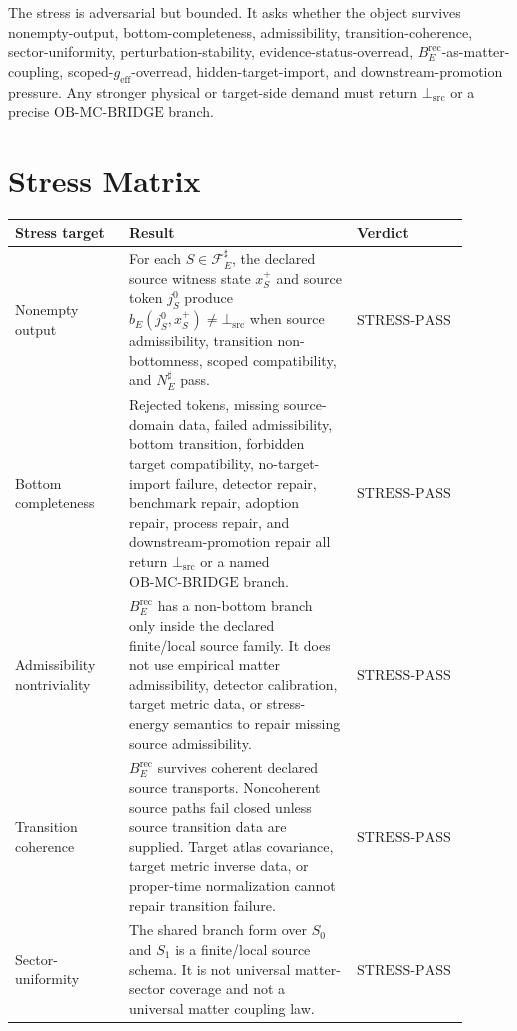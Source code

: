 \documentclass[11pt]{article}
\newcommand{\geff}{g_{\mathrm{eff}}}
\newcommand{\BottomSrc}{\bot_{\mathrm{src}}}
\newcommand{\OBMCB}{\mathrm{OB}\mbox{-}\mathrm{MC}\mbox{-}\mathrm{BRIDGE}}
\newcommand{\BErec}{B_E^{\mathrm{rec}}}
\newcommand{\StressPass}{\mathrm{STRESS}\mbox{-}\mathrm{PASS}}
\begin{document}
The stress is adversarial but bounded. It asks whether the object survives
nonempty-output, bottom-completeness, admissibility, transition-coherence,
sector-uniformity, perturbation-stability, evidence-status-overread,
\(\BErec\)-as-matter-coupling, scoped-\(\geff\)-overread, hidden-target-import,
and downstream-promotion pressure. Any stronger physical or target-side demand
must return \(\BottomSrc\) or a precise \(\OBMCB\) branch.

\section{Stress Matrix}

\begin{longtable}{p{0.24\linewidth}p{0.48\linewidth}p{0.18\linewidth}}
\toprule
Stress target & Result & Verdict \\
\midrule
Nonempty output &
For each \(S\in\mathcal{F}_E^\sharp\), the declared source witness state
\(x_S^+\) and source token \(j_S^0\) produce \(b_E(j_S^0,x_S^+)\neq
\BottomSrc\) when source admissibility, transition non-bottomness, scoped
compatibility, and \(N_E^\sharp\) pass. & \(\StressPass\) \\
\addlinespace
Bottom completeness &
Rejected tokens, missing source-domain data, failed admissibility, bottom
transition, forbidden target compatibility, no-target-import failure,
detector repair, benchmark repair, adoption repair, process repair, and
downstream-promotion repair all return \(\BottomSrc\) or a named
\(\OBMCB\) branch. & \(\StressPass\) \\
\addlinespace
Admissibility nontriviality &
\(\BErec\) has a non-bottom branch only inside the declared finite/local
source family. It does not use empirical matter admissibility, detector
calibration, target metric data, or stress-energy semantics to repair missing
source admissibility. & \(\StressPass\) \\
\addlinespace
Transition coherence &
\(\BErec\) survives coherent declared source transports. Noncoherent source
paths fail closed unless source transition data are supplied. Target atlas
covariance, target metric inverse data, or proper-time normalization cannot
repair transition failure. & \(\StressPass\) \\
\addlinespace
Sector-uniformity &
The shared branch form over \(S_0\) and \(S_1\) is a finite/local source
schema. It is not universal matter-sector coverage and not a universal matter
coupling law. & \(\StressPass\) \\

\end{longtable}
\end{document}
